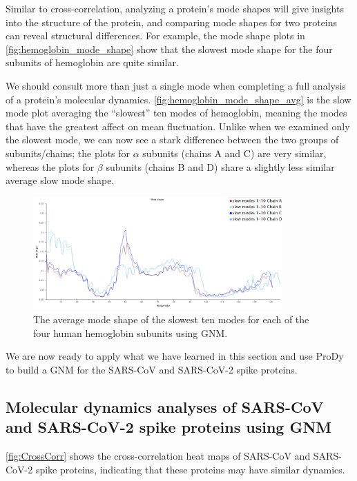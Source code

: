 Similar to cross-correlation, analyzing a protein's mode shapes will give insights into the structure of the protein, and comparing mode shapes for two proteins can reveal structural differences. For example, the mode shape plots in \autoref{fig:hemoglobin_mode_shape} show that the slowest mode shape for the four subunits of hemoglobin are quite similar.

We should consult more than just a single mode when completing a full analysis of a protein's molecular dynamics. \autoref{fig:hemoglobin_mode_shape_avg} is the slow mode plot averaging the ``slowest'' ten modes of hemoglobin, meaning the modes that have the greatest affect on mean fluctuation. Unlike when we examined only the slowest mode, we can now see a stark difference between the two groups of subunits/chains; the plots for $\alpha$ subunits (chains A and C) are very similar, whereas the plots for $\beta$ subunits (chains B and D) share a slightly less similar average slow mode shape.\\

\begin{figure}[h]
	\centering
	\mySfFamily
	\includegraphics[width = 0.85\textwidth]{../images/hemoglobin_mode_shape_avg.png}
	\caption{The average mode shape of the slowest ten modes for each of the four human hemoglobin subunits using GNM.}
	\label{fig:hemoglobin_mode_shape_avg}
\end{figure}

We are now ready to apply what we have learned in this section and use ProDy to build a GNM for the SARS-CoV and SARS-CoV-2 spike proteins. 

\FloatBarrier
{}
\subsection{Molecular dynamics analyses of SARS-CoV and SARS-CoV-2 spike proteins using GNM}

\autoref{fig:CrossCorr} shows the cross-correlation heat maps of SARS-CoV and SARS-CoV-2 spike proteins, indicating that these proteins may have similar dynamics.\\

